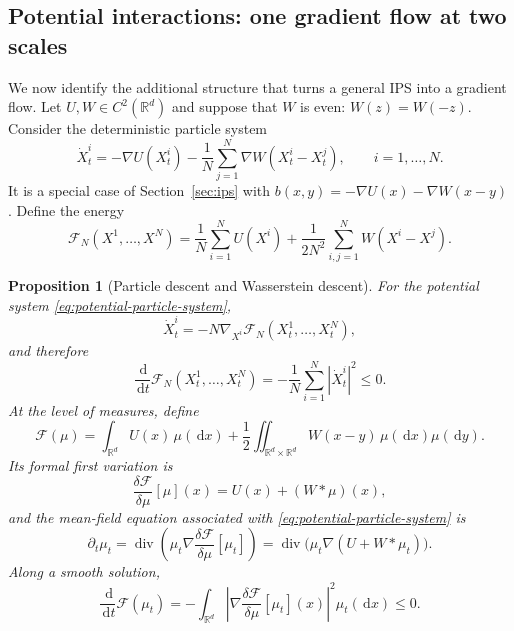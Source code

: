 \documentclass[11pt]{amsart}
\numberwithin{equation}{section}
\theoremstyle{plain}
\newtheorem{proposition}[theorem]{Proposition}
\newcommand{\R}{\mathbb{R}}
\newcommand{\dd}{\,\mathrm{d}}
\newcommand{\abs}[1]{\left\lvert#1\right\rvert}
\DeclareMathOperator{\diver}{div}
\begin{document}
\subsection{Potential interactions: one gradient flow at two scales}

We now identify the additional structure that turns a general IPS into
a gradient flow.  Let $U,W\in C^2(\R^d)$ and suppose that $W$ is even:
$W(z)=W(-z)$.  Consider the deterministic particle system
\begin{equation}\label{eq:potential-particle-system}
 \dot X_t^i=-\nabla U(X_t^i)
 -\frac1N\sum_{j=1}^N\nabla W(X_t^i-X_t^j),
 \qquad i=1,\ldots,N.
\end{equation}
It is a special case of Section~\ref{sec:ips} with
$b(x,y)=-\nabla U(x)-\nabla W(x-y)$.  Define the energy
\begin{equation}\label{eq:finite-particle-energy}
 \mathcal F_N(X^1,\ldots,X^N)
 =\frac1N\sum_{i=1}^NU(X^i)
 +\frac1{2N^2}\sum_{i,j=1}^NW(X^i-X^j).
\end{equation}

\begin{proposition}[Particle descent and Wasserstein descent]
\label{prop:ips-wasserstein-gradient-flow}
For the potential system \eqref{eq:potential-particle-system},
\begin{equation}\label{eq:particle-gradient-flow}
 \dot X_t^i=-N\nabla_{X^i}\mathcal F_N(X_t^1,\ldots,X_t^N),
\end{equation}
and therefore
\begin{equation}\label{eq:particle-energy-dissipation}
 \frac{\dd}{\dd t}\mathcal F_N(X_t^1,\ldots,X_t^N)
 =-\frac1N\sum_{i=1}^N\abs{\dot X_t^i}^2\leq0.
\end{equation}
At the level of measures, define
\begin{equation}\label{eq:interaction-energy}
 \mathcal F(\mu)
 =\int_{\R^d}U(x)\,\mu(\dd x)
 +\frac12\iint_{\R^d\times\R^d}
 W(x-y)\,\mu(\dd x)\mu(\dd y).
\end{equation}
Its formal first variation is
\begin{equation}\label{eq:interaction-first-variation}
 \frac{\delta\mathcal F}{\delta\mu}[\mu](x)
 =U(x)+(W*\mu)(x),
\end{equation}
and the mean-field equation associated with
\eqref{eq:potential-particle-system} is
\begin{equation}\label{eq:wasserstein-interaction-gf}
 \partial_t\mu_t
 =\diver\left(\mu_t\nabla
     \frac{\delta\mathcal F}{\delta\mu}[\mu_t]\right)
 =\diver\bigl(\mu_t\nabla(U+W*\mu_t)\bigr).
\end{equation}
Along a smooth solution,
\begin{equation}\label{eq:energy-dissipation}
 \frac{\dd}{\dd t}\mathcal F(\mu_t)
 =-\int_{\R^d}
 \left|\nabla\frac{\delta\mathcal F}{\delta\mu}[\mu_t](x)\right|^2
 \mu_t(\dd x)\leq0.
\end{equation}
\end{proposition}
\end{document}
